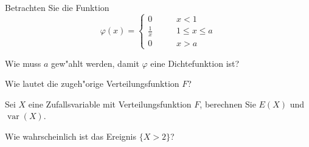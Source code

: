 Betrachten Sie die Funktion
\[
\varphi(x)=\begin{cases}
0&\qquad x < 1\\
\frac1x&\qquad 1\le x\le a\\
0&\qquad x > a
\end{cases}
\]
\begin{teilaufgaben}
\item Wie muss $a$ gew"ahlt werden, damit $\varphi$ eine Dichtefunktion
ist?
\item Wie lautet die zugeh"orige Verteilungsfunktion $F$?
\item Sei $X$ eine Zufallsvariable mit Verteilungsfunktion $F$, berechnen Sie
$E(X)$ und $\operatorname{var}(X)$.
\item Wie wahrscheinlich ist das Ereignis $\{X>2\}$?
\end{teilaufgaben}

